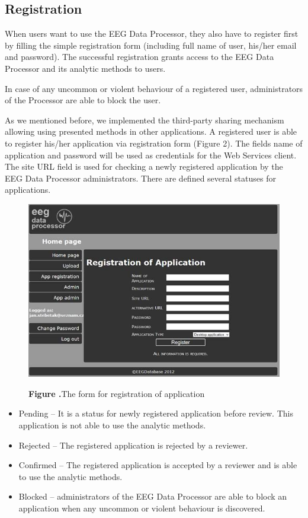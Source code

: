 \documentclass{frontiersSCNS} %
\begin{document}
\subsection{Registration}

When users want to use the EEG Data Processor, they also have to register first by filling the simple registration form (including full name of user, his/her email and password). The successful registration grants access to the EEG Data Processor and its analytic methods to users.

In case of any uncommon or violent behaviour of a registered user, administrators of the Processor are able to block the user.

As we mentioned before, we implemented the third-party sharing mechanism allowing using presented methods in other applications. A registered user is able to register his/her application via registration form (Figure 2). The fields name of application and password will be used as credentials for the Web Services client. The site URL field is used for checking a newly registered application by the EEG Data Processor administrators. There are defined several statuses for applications.

\begin{figure}
\begin{center}
\includegraphics[width=16cm]{edp01}%
\end{center}
\textbf{\label{fig:02} Figure .}{The form for registration of application }
\end{figure}

\begin{itemize}
\item Pending – It is a status for newly registered application before review. This application is not able to use the analytic methods.
\item Rejected – The registered application is rejected by a reviewer.
\item Confirmed – The registered application is accepted by a reviewer and is able to use the analytic methods.
\item Blocked – administrators of the EEG Data Processor are able to block an application when any uncommon or violent behaviour is discovered.

\end{itemize}
\end{document}
